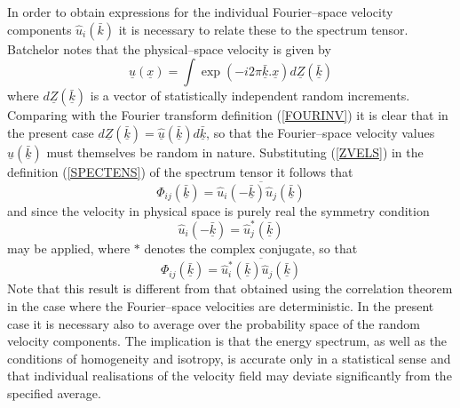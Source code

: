 \documentclass[dvips]{article}
\begin{document}
In order to obtain expressions for the individual Fourier--space velocity
components $\hat{u}_{i}(\bar{k})$ it is necessary to relate these to the 
spectrum tensor.  Batchelor \cite{batchelor53} notes that the physical--space
velocity is given by
\begin{equation}
\underline{u}(\underline{x}) = \int
\exp{(-i2\pi\underline{\bar{k}}.\underline{x})}
d\underline{Z}(\underline{\bar{k}})
\label{ZVELS}
\end{equation}
where $d\underline{Z}(\underline{\bar{k}})$ is a vector of statistically
independent random increments.  Comparing with the Fourier transform
definition (\ref{FOURINV}) it is clear that in the present case
$d\underline{Z}(\underline{\bar{k}}) =
\underline{\hat{u}}(\underline{\bar{k}})d\underline{\bar{k}}$,
so that the Fourier--space
velocity values $\underline{\hat{u}}(\underline{\bar{k}})$ must
themselves be random in
nature.  Substituting (\ref{ZVELS}) in the definition (\ref{SPECTENS})
of the spectrum tensor it follows that
\begin{equation}
\Phi_{ij}(\underline{\bar{k}})
= \overline{\hat{u}_{i}(-\underline{\bar{k}})\hat{u}_{j}(\underline{\bar{k}})}
\end{equation} 
and since the velocity in physical space is purely real the symmetry condition
\begin{equation}
\hat{u}_{i}(-\underline{\bar{k}})=\hat{u}_{j}^{*}(\underline{\bar{k}})
\label{VELSYM}
\end{equation}
may be applied, where $*$ denotes the complex conjugate, so that
\begin{equation}
\Phi_{ij}(\underline{\bar{k}})
= \overline{\hat{u}_{i}^{*}(\underline{\bar{k}})\hat{u}_{j}(\underline{\bar{k}})}
\label{SPECVELS}
\end{equation} 
Note that this result is different from that obtained using the
correlation theorem in the case where the Fourier--space velocities are
deterministic.  In the present case it is necessary also to average over the
probability space of the random velocity components.  The
implication is that the energy spectrum, as well as the conditions of
homogeneity and isotropy, is accurate only in a statistical sense and that
individual realisations of the velocity field may deviate significantly
from the specified average.
\end{document}
